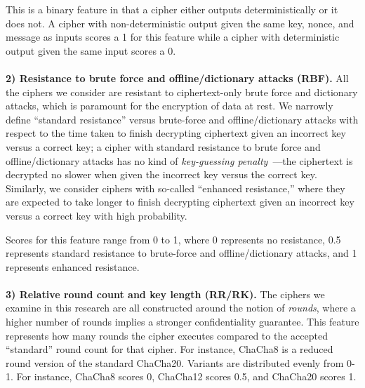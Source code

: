 This is a binary feature in that a cipher either outputs deterministically or
it does not. A cipher with non-deterministic output given the same key, nonce,
and message as inputs scores a 1 for this feature while a cipher with
deterministic output given the same input scores a 0.\\
\\
\textbf{2) Resistance to brute force and offline/dictionary attacks (RBF).}
All the ciphers we consider are resistant to ciphertext-only brute force and
dictionary attacks, which is paramount for the encryption of data at rest. We
narrowly define ``standard resistance'' versus brute-force and
offline/dictionary attacks with respect to the time taken to finish decrypting
ciphertext given an incorrect key versus a correct key; a cipher with standard
resistance to brute force and offline/dictionary attacks has no kind of
\emph{key-guessing penalty}~\cite{Freestyle}---the ciphertext is decrypted no
slower when given the incorrect key versus the correct key. Similarly, we
consider ciphers with so-called ``enhanced resistance,'' where they are expected
to take longer to finish decrypting ciphertext given an incorrect key versus a
correct key with high probability.

Scores for this feature range from 0 to 1, where 0 represents no resistance,
0.5 represents standard resistance to brute-force and offline/dictionary
attacks, and 1 represents enhanced resistance.\\
\\
\textbf{3) Relative round count and key length (RR/RK).} The ciphers we examine
in this research are all constructed around the notion of \emph{rounds}, where a
higher number of rounds implies a stronger confidentiality guarantee. This
feature represents how many rounds the cipher executes compared to the accepted
``standard'' round count for that cipher. For instance, ChaCha8 is a reduced round
version of the standard ChaCha20. Variants are distributed evenly from 0-1. For
instance, ChaCha8 scores 0, ChaCha12 scores 0.5, and ChaCha20 scores 1\@.

